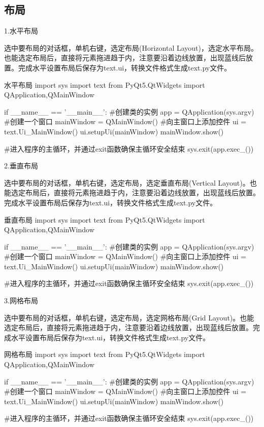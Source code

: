 \documentclass[openbib]{article}
\begin{document}
\subsection{布局}
\begin{center}
	1.水平布局
\end{center}
选中要布局的对话框，单机右键，选定布局(Horizontal Layout)，选定水平布局。也能选定布局后，直接将元素拖进趋于内，注意要沿着边线放置，出现蓝线后放置。完成水平设置布局后保存为text.ui，转换文件格式生成text.py文件。
\begin{Python}{水平布局}
import sys
import text
from PyQt5.QtWidgets import QApplication,QMainWindow

if __name__ == '__main__':
	#创建类的实例
	app = QApplication(sys.argv)
	#创建一个窗口
	mainWindow = QMainWindow()
	#向主窗口上添加控件
	ui = text.Ui_MainWindow()
	ui.setupUi(mainWindow)
	mainWindow.show()
	
	#进入程序的主循环，并通过exit函数确保主循环安全结束
	sys.exit(app.exec_())
\end{Python}
\begin{center}
	2.垂直布局
\end{center}
选中要布局的对话框，单机右键，选定布局，选定垂直布局(Vertical Layout)。也能选定布局后，直接将元素拖进趋于内，注意要沿着边线放置，出现蓝线后放置。完成水平设置布局后保存为text.ui，转换文件格式生成text.py文件。
\begin{Python}{垂直布局}
import sys
import text
from PyQt5.QtWidgets import QApplication,QMainWindow

if __name__ == '__main__':
	#创建类的实例
	app = QApplication(sys.argv)
	#创建一个窗口
	mainWindow = QMainWindow()
	#向主窗口上添加控件
	ui = text.Ui_MainWindow()
	ui.setupUi(mainWindow)
	mainWindow.show()
	
	#进入程序的主循环，并通过exit函数确保主循环安全结束
	sys.exit(app.exec_())
\end{Python}
\begin{center}
	3.网格布局
\end{center}
选中要布局的对话框，单机右键，选定布局，选定网格布局(Grid Layout)。也能选定布局后，直接将元素拖进趋于内，注意要沿着边线放置，出现蓝线后放置。完成水平设置布局后保存为text.ui，转换文件格式生成text.py文件。
\begin{Python}{网格布局}
import sys
import text
from PyQt5.QtWidgets import QApplication,QMainWindow

if __name__ == '__main__':
	#创建类的实例
	app = QApplication(sys.argv)
	#创建一个窗口
	mainWindow = QMainWindow()
	#向主窗口上添加控件
	ui = text.Ui_MainWindow()
	ui.setupUi(mainWindow)
	mainWindow.show()
	
	#进入程序的主循环，并通过exit函数确保主循环安全结束
	sys.exit(app.exec_())
\end{Python}
\end{document}
